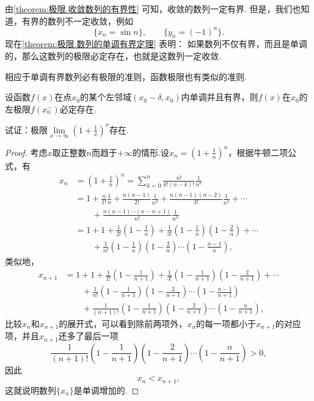 由\cref{theorem:极限.收敛数列的有界性} 可知，收敛的数列一定有界.
但是，我们也知道，有界的数列不一定收敛，例如\[
	\{ x_n = \sin n \}, \qquad
	\{ y_n = (-1)^n \}.
\]
现在\cref{theorem:极限.数列的单调有界定理} 表明：
如果数列不仅有界，而且是单调的，那么这数列的极限必定存在，也就是这数列一定收敛.

相应于单调有界数列必有极限的准则，函数极限也有类似的准则.
\begin{theorem}\label{theorem:极限.函数的单调有界定理}
设函数\(f(x)\)在点\(x_0\)的某个左邻域\((x_0-\delta,x_0)\)内单调并且有界，则\(f(x)\)在\(x_0\)的左极限\(f(x_0^-)\)必定存在.
\end{theorem}

\begin{example}[重要极限II]
试证：极限\(\lim\limits_{x \to \infty}\left(1 + \frac{1}{x}\right)^x\)存在.
\begin{proof}
考虑\(x\)取正整数\(n\)而趋于\(+\infty\)的情形.设\(x_n=\left(1+\frac{1}{n}\right)^n\)，根据牛顿二项公式，有\begin{align*}
x_n &= \left(1+\frac{1}{n}\right)^n
= \sum\limits_{k=0}^n \frac{n!}{k! (n-k)!} \frac{1}{n^k} \\
&= 1 + \frac{n}{1!}\frac{1}{n} + \frac{n(n-1)}{2!}\frac{1}{n^2} + \frac{n(n-1)(n-2)}{3!}\frac{1}{n^3} + \dotsb \\
&\qquad+ \frac{n(n-1)\dotsm(n-n+1)}{n!}\frac{1}{n^n} \\
&= 1 + 1 + \frac{1}{2!}\left(1-\frac{1}{n}\right) + \frac{1}{3!}\left(1-\frac{1}{n}\right)\left(1-\frac{2}{n}\right) + \dotsb \\
&\qquad+ \frac{1}{n!}\left(1-\frac{1}{n}\right)\left(1-\frac{2}{n}\right)\dotsm\left(1-\frac{n-1}{n}\right),
\end{align*}
类似地，\begin{align*}
x_{n+1}
&= 1 + 1 + \frac{1}{2!}\left(1-\frac{1}{n+1}\right) + \frac{1}{3!}\left(1-\frac{1}{n+1}\right)\left(1-\frac{2}{n+1}\right) + \dotsb \\
&\qquad+ \frac{1}{n!}\left(1-\frac{1}{n+1}\right)\left(1-\frac{2}{n+1}\right)\dotsm\left(1-\frac{n-1}{n+1}\right) \\
&\qquad+ \frac{1}{(n+1)!}\left(1-\frac{1}{n+1}\right)\left(1-\frac{2}{n+1}\right)\dotsm\left(1-\frac{n}{n+1}\right),
\end{align*}
比较\(x_n\)和\(x_{n+1}\)的展开式，可以看到除前两项外，\(x_n\)的每一项都小于\(x_{n+1}\)的对应项，并且\(x_{n+1}\)还多了最后一项\[
\frac{1}{(n+1)!}\left(1-\frac{1}{n+1}\right)\left(1-\frac{2}{n+1}\right)\dotsm\left(1-\frac{n}{n+1}\right) > 0,
\]因此\[
x_n < x_{n+1},
\]这就说明数列\(\{x_n\}\)是单调增加的.


\end{proof}
\end{example}
